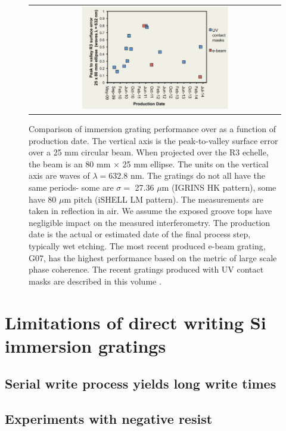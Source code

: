 \documentclass[]{spie}  %
\begin{document}
\begin{figure}
  \begin{center}
 \begin{tabular}{c}
    \includegraphics[width=0.6\textwidth]{figs/PV_time_paper_2014.pdf}
   \end{tabular}
  \end{center}
    \caption{Comparison of immersion grating performance over as a function of production date.  The vertical axis is the peak-to-valley surface error over a 25 mm circular beam.  When projected over the R3 echelle, the beam is an 80 mm $\times$ 25 mm ellipse.  The units on the vertical axis are waves of $\lambda = 632.8 $ nm.  The gratings do not all have the same periods- some are $\sigma = $ 27.36 $\mu$m (IGRINS HK pattern), some have 80 $\mu$m pitch (iSHELL LM pattern).  The measurements are taken in reflection in air.  We assume the exposed groove tops have negligible impact on the measured interferometry.  The production date is the actual or estimated date of the final process step, typically wet etching.  The most recent produced e-beam grating, G07, has the highest performance based on the metric of large scale phase coherence.  The recent gratings produced with UV contact masks are described in this volume \cite{2014SPIE.BROOKS.GRATINGS}.  }
  \label{fig:igrams}
\end{figure}


\section{Limitations of direct writing Si immersion gratings}
\subsection{Serial write process yields long write times}
\subsection{Experiments with negative resist}
\end{document}

